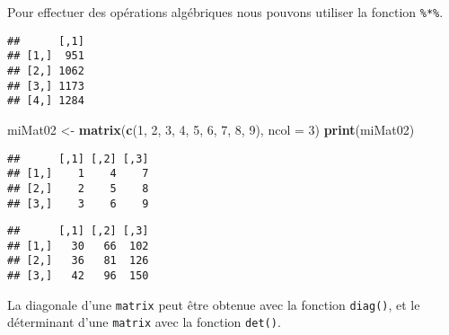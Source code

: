\documentclass[]{book}
\newenvironment{Shaded}{\begin{snugshade}}{\end{snugshade}}
\newcommand{\KeywordTok}[1]{\textcolor[rgb]{0.13,0.29,0.53}{\textbf{#1}}}
\newcommand{\DataTypeTok}[1]{\textcolor[rgb]{0.13,0.29,0.53}{#1}}
\newcommand{\DecValTok}[1]{\textcolor[rgb]{0.00,0.00,0.81}{#1}}
\newcommand{\StringTok}[1]{\textcolor[rgb]{0.31,0.60,0.02}{#1}}
\newcommand{\CommentTok}[1]{\textcolor[rgb]{0.56,0.35,0.01}{\textit{#1}}}
\newcommand{\OperatorTok}[1]{\textcolor[rgb]{0.81,0.36,0.00}{\textbf{#1}}}
\newcommand{\NormalTok}[1]{#1}
\theoremstyle{definition}
\theoremstyle{definition}
\theoremstyle{definition}
\theoremstyle{remark}
\begin{document}
Pour effectuer des opérations algébriques nous pouvons utiliser la
fonction \texttt{\%*\%}.

\begin{Shaded}
\end{Shaded}

\begin{verbatim}
##      [,1]
## [1,]  951
## [2,] 1062
## [3,] 1173
## [4,] 1284
\end{verbatim}

\begin{Shaded}
\begin{Highlighting}[]
\NormalTok{miMat02 <-}\StringTok{ }\KeywordTok{matrix}\NormalTok{(}\KeywordTok{c}\NormalTok{(}\DecValTok{1}\NormalTok{, }\DecValTok{2}\NormalTok{, }\DecValTok{3}\NormalTok{, }\DecValTok{4}\NormalTok{, }\DecValTok{5}\NormalTok{, }\DecValTok{6}\NormalTok{, }\DecValTok{7}\NormalTok{, }\DecValTok{8}\NormalTok{, }\DecValTok{9}\NormalTok{), }\DataTypeTok{ncol =} \DecValTok{3}\NormalTok{)}
\KeywordTok{print}\NormalTok{(miMat02)}
\end{Highlighting}
\end{Shaded}

\begin{verbatim}
##      [,1] [,2] [,3]
## [1,]    1    4    7
## [2,]    2    5    8
## [3,]    3    6    9
\end{verbatim}

\begin{Shaded}
\end{Shaded}

\begin{verbatim}
##      [,1] [,2] [,3]
## [1,]   30   66  102
## [2,]   36   81  126
## [3,]   42   96  150
\end{verbatim}

La diagonale d'une \texttt{matrix} peut être obtenue avec la fonction
\texttt{diag()}, et le déterminant d'une \texttt{matrix} avec la
fonction \texttt{det()}.
\end{document}
